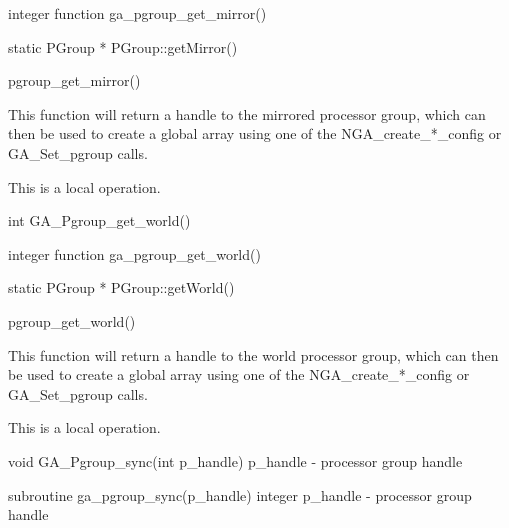 \documentclass[12pt]{article}
\begin{document}
\begin{fapi}
integer function ga_pgroup_get_mirror()
\end{fapi}

\begin{cxxapi}
static PGroup * PGroup::getMirror()
\end{cxxapi}

\begin{pyapi}
pgroup_get_mirror() 
\end{pyapi} 


\begin{desc}

This function will return a handle to the mirrored processor group, which can then be used to create a global array using one of the NGA_create_*_config or GA_Set_pgroup calls.

This is a local operation. 
\end{desc}


\begin{capi}
int GA_Pgroup_get_world()
\end{capi}

\begin{fapi}
integer function ga_pgroup_get_world()
\end{fapi}

\begin{cxxapi}
static PGroup * PGroup::getWorld()
\end{cxxapi}

\begin{pyapi}
pgroup_get_world() 
\end{pyapi} 


\begin{desc}

This function will return a handle to the world processor group, which can then be used to create a global array using one of the NGA_create_*_config or GA_Set_pgroup calls.

This is a local operation.
\end{desc}


\begin{capi}
void GA_Pgroup_sync(int p_handle)
   p_handle                     - processor group handle                  \access{[input]} 
\end{capi}

\begin{fapi}
subroutine ga_pgroup_sync(p_handle)
   integer p_handle             - processor group handle                  \access{[input]} 
\end{fapi}
\end{document}
